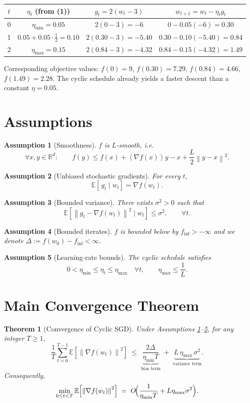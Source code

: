 \documentclass{article}
\newtheorem{theorem}{Theorem}
\newtheorem{assumption}{Assumption}
\newcommand{\EE}{\mathbb{E}}
\newcommand{\RR}{\mathbb{R}}
\newcommand{\norm}[1]{\left\lVert #1\right\rVert}
\newcommand{\inner}[1]{\left\langle #1\right\rangle}
\begin{document}
\begin{center}
\begin{tabular}{c|c|c|c}
$t$ & $\eta_t$ (from (1)) & $g_t=2(w_t-3)$ & $w_{t+1}=w_t-\eta_t g_t$ \\ \hline
0 & $\eta_{\min}=0.05$ & $2(0-3)=-6$ & $0-0.05(-6)=0.30$ \\
1 & $0.05+0.05\cdot\frac{1}{2}=0.10$ & $2(0.30-3)=-5.40$ & $0.30-0.10(-5.40)=0.84$ \\
2 & $\eta_{\max}=0.15$ & $2(0.84-3)=-4.32$ & $0.84-0.15(-4.32)=1.49$
\end{tabular}
\end{center}
Corresponding objective values:
$f(0)=9$, $f(0.30)=7.29$, $f(0.84)=4.66$, $f(1.49)=2.28$.  
The cyclic schedule already yields a faster descent than a constant $\eta=0.05$.

\newpage
\section*{Assumptions}
\begin{assumption}[Smoothness]\label{ass:smooth}
$f$ is $L$‑smooth, i.e.
\[
\forall x,y\in\RR^{d}:\qquad
f(y)\le f(x)+\inner{\nabla f(x)}{y-x}+\frac{L}{2}\norm{y-x}^{2}.
\]
\end{assumption}
\begin{assumption}[Unbiased stochastic gradients]\label{ass:unbiased}
For every $t$,
\[
\EE\!\left[\,g_t\mid w_t\right]=\nabla f(w_t).
\]
\end{assumption}
\begin{assumption}[Bounded variance]\label{ass:variance}
There exists $\sigma^{2}>0$ such that
\[
\EE\!\left[\norm{g_t-\nabla f(w_t)}^{2}\mid w_t\right]\le\sigma^{2},
\qquad\forall t .
\]
\end{assumption}
\begin{assumption}[Bounded iterates]\label{ass:lower}
$f$ is bounded below by $f_{\inf}>-\infty$ and we denote $ \Delta:=f(w_0)-f_{\inf}<\infty$.
\end{assumption}
\begin{assumption}[Learning‑rate bounds]\label{ass:lr}
The cyclic schedule satisfies
\[
0<\eta_{\min}\le \eta_t\le\eta_{\max}\quad\forall t,
\qquad
\eta_{\max}\le \frac{1}{L}.
\]
\end{assumption}

\section*{Main Convergence Theorem}
\begin{theorem}[Convergence of Cyclic SGD]\label{thm:convergence}
Under Assumptions \ref{ass:smooth}–\ref{ass:lr}, for any integer $T\ge 1$,
\[
\frac{1}{T}\sum_{t=0}^{T-1}\EE\!\left[\norm{\nabla f(w_t)}^{2}\right]
\;\le\;
\underbrace{\frac{2\Delta}{\eta_{\min}T}}_{\text{bias term}}
\;+\;
\underbrace{L\,\eta_{\max}\,\sigma^{2}}_{\text{variance term}} .
\tag{3}
\]
Consequently,
\[
\min_{0\le t<T}\EE\!\left[\norm{\nabla f(w_t)}^{2}\right]
\;=\; O\!\Bigl(\frac{1}{\eta_{\min}T}+L\eta_{\max}\sigma^{2}\Bigr).
\]
\end{theorem}
\end{document}
